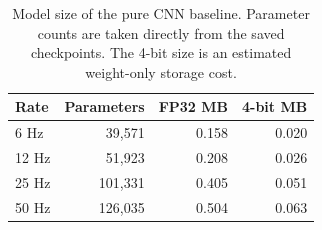 \begin{table}[t]
  \centering
  \small
  \caption{Model size of the pure CNN baseline. Parameter counts are taken directly from the saved checkpoints. The 4-bit size is an estimated weight-only storage cost.}
  \label{tab:standard_cnn_nolstm_size_wear}
  \begin{tabular}{lrrr}
    \toprule
    Rate & Parameters & FP32 MB & 4-bit MB \\
    \midrule
    6 Hz & 39,571 & 0.158 & 0.020 \\
    12 Hz & 51,923 & 0.208 & 0.026 \\
    25 Hz & 101,331 & 0.405 & 0.051 \\
    50 Hz & 126,035 & 0.504 & 0.063 \\
    \bottomrule
  \end{tabular}
\end{table}
